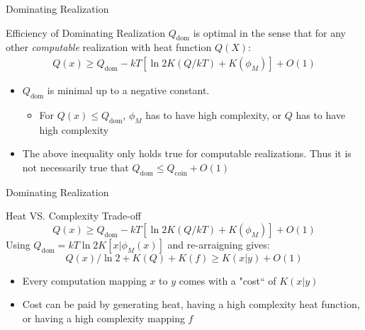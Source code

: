\documentclass{beamer}
\begin{document}
\begin{frame}{Dominating Realization}
\begin{block}{Efficiency of Dominating Realization}
    $Q_\text{dom}$ is optimal in the sense that for any other \textit{computable} realization with heat function $Q(X)$:
    \begin{align*}
        Q(x) \ge Q_\text{dom} - kT[\ln 2K(Q/kT) + K(\phi_M)] + O(1)
    \end{align*}
    \begin{itemize}
        \item $Q_\text{dom}$ is minimal up to a negative constant. 
        \begin{itemize}
            \item For $Q(x) \le Q_\text{dom}$, $\phi_M$ has to have high complexity, or $Q$ has to have high complexity
        \end{itemize}
        \item The above inequality only holds true for computable realizations. Thus it is not necessarily true that $Q_\text{dom}\le Q_\text{coin} + O(1)$
    \end{itemize}
\end{block}
\end{frame}



\begin{frame}{Dominating Realization}
\begin{block}{Heat VS. Complexity Trade-off}
     \begin{equation*}
        Q(x) \ge Q_\text{dom} - kT[\ln 2K(Q/kT) + K(\phi_M)] + O(1)
    \end{equation*}
    Using $Q_\text{dom} = kT\ln 2K[x|\phi_M(x)]$ and re-arraigning gives:
    \begin{equation*}
        Q(x)/\ln 2 + K(Q) + K(f) \ge K(x|y) + O(1)
    \end{equation*}
    \begin{itemize}
        \item Every computation mapping $x$ to $y$ comes with a "cost`` of $K(x|y)$
        \item Cost can be paid by generating heat, having a high complexity heat function, or having a high complexity mapping $f$
    \end{itemize}
\end{block}
\end{frame}
\end{document}
